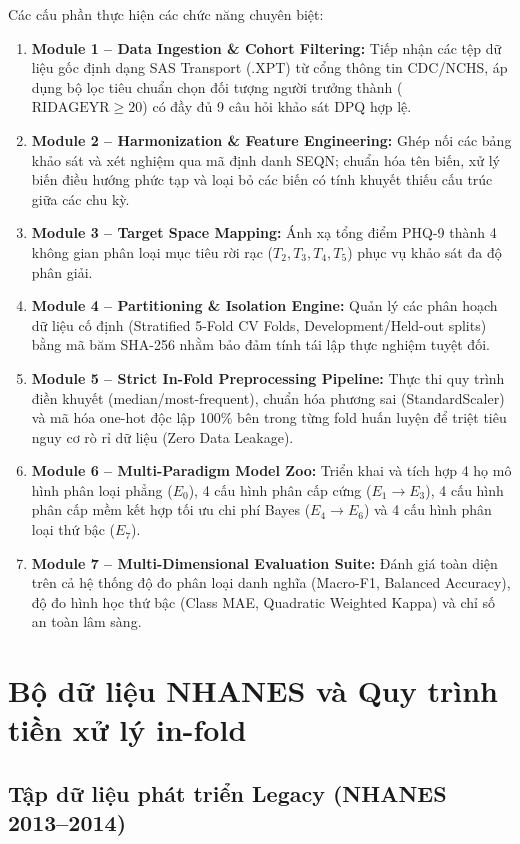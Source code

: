 Các cấu phần thực hiện các chức năng chuyên biệt:
\begin{enumerate}
    \item \textbf{Module 1 -- Data Ingestion \& Cohort Filtering:} Tiếp nhận các tệp dữ liệu gốc định dạng SAS Transport (.XPT) từ cổng thông tin CDC/NCHS, áp dụng bộ lọc tiêu chuẩn chọn đối tượng người trưởng thành ($\text{RIDAGEYR} \ge 20$) có đầy đủ 9 câu hỏi khảo sát DPQ hợp lệ.
    \item \textbf{Module 2 -- Harmonization \& Feature Engineering:} Ghép nối các bảng khảo sát và xét nghiệm qua mã định danh SEQN; chuẩn hóa tên biến, xử lý biến điều hướng phức tạp và loại bỏ các biến có tính khuyết thiếu cấu trúc giữa các chu kỳ.
    \item \textbf{Module 3 -- Target Space Mapping:} Ánh xạ tổng điểm PHQ-9 thành 4 không gian phân loại mục tiêu rời rạc ($T_2, T_3, T_4, T_5$) phục vụ khảo sát đa độ phân giải.
    \item \textbf{Module 4 -- Partitioning \& Isolation Engine:} Quản lý các phân hoạch dữ liệu cố định (Stratified 5-Fold CV Folds, Development/Held-out splits) bằng mã băm SHA-256 nhằm bảo đảm tính tái lập thực nghiệm tuyệt đối.
    \item \textbf{Module 5 -- Strict In-Fold Preprocessing Pipeline:} Thực thi quy trình điền khuyết (median/most-frequent), chuẩn hóa phương sai (StandardScaler) và mã hóa one-hot độc lập 100\% bên trong từng fold huấn luyện để triệt tiêu nguy cơ rò rỉ dữ liệu (Zero Data Leakage).
    \item \textbf{Module 6 -- Multi-Paradigm Model Zoo:} Triển khai và tích hợp 4 họ mô hình phân loại phẳng ($E_0$), 4 cấu hình phân cấp cứng ($E_1 \to E_3$), 4 cấu hình phân cấp mềm kết hợp tối ưu chi phí Bayes ($E_4 \to E_6$) và 4 cấu hình phân loại thứ bậc ($E_7$).
    \item \textbf{Module 7 -- Multi-Dimensional Evaluation Suite:} Đánh giá toàn diện trên cả hệ thống độ đo phân loại danh nghĩa (Macro-F1, Balanced Accuracy), độ đo hình học thứ bậc (Class MAE, Quadratic Weighted Kappa) và chỉ số an toàn lâm sàng.
\end{enumerate}

\section{Bộ dữ liệu NHANES và Quy trình tiền xử lý in-fold}
\label{sec:du-lieu-nghien-cuu}

\subsection{Tập dữ liệu phát triển Legacy (NHANES 2013--2014)}
\label{subsec:legacy-cohort}

